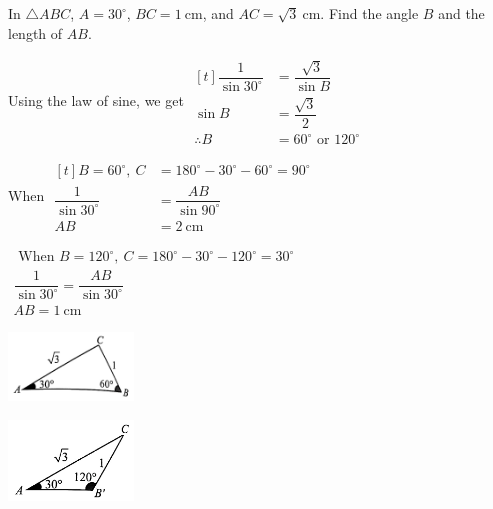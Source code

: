 \documentclass{report}
\begin{document}
\begin{question}
    In $\triangle ABC$, $A=30^\circ$, $BC=1 \mathrm{~cm}$, and $AC=\sqrt{3} \mathrm{~cm}$. Find the angle $B$ and the length of $AB$.

    \sol{}

    \begin{vwcol}[widths={0.6,0.4}, sep=8mm, rule=0pt,justify=flushleft]
        \noindent Using the law of sine, we get $\begin{aligned}[t]
            \dfrac{1}{\sin 30^{\circ}} &=\dfrac{\sqrt{3}}{\sin B} \\
            \sin B &=\dfrac{\sqrt{3}}{2} \\
            \therefore B &=60^{\circ} \text { or } 120^{\circ}
        \end{aligned}$
    
        \noindent When $\begin{aligned}[t] B=60^{\circ},\ C & =180^{\circ}-30^{\circ}-60^{\circ}=90^{\circ} \\ \dfrac{1}{\sin 30^{\circ}} & =\dfrac{A B}{\sin 90^{\circ}}\\ AB&=2 \mathrm{~cm} \end{aligned}$
    
        \noindent $\begin{gathered}\text { When } B=120^{\circ},\ C=180^{\circ}-30^{\circ}-120^{\circ}=30^{\circ} \\ \dfrac{1}{\sin 30^{\circ}}=\dfrac{A B}{\sin 30^{\circ}} \\ A B=1 \mathrm{~cm}\end{gathered}$

        \includegraphics[width=0.25\textwidth]{assets/10-6.jpg}

        \vspace{3em}
        \includegraphics[width=0.25\textwidth]{assets/10-7.jpg}
    \end{vwcol}
\end{question}
\end{document}
